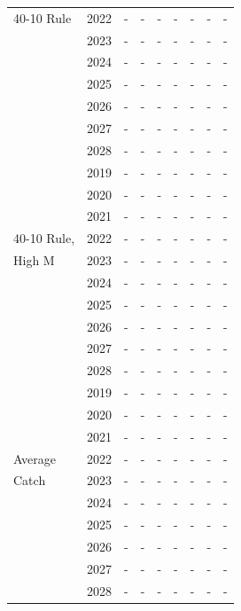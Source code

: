 \documentclass[12pt,]{article}
\begin{document}
\begin{table}[ht]
{\begin{tabular}{l|cc|>{\centering}p{.7in}c|>{\centering}p{.7in}c|>{\centering}p{.7in}c}
  40-10 Rule & 2022 & - & - & - & - & - & - & - \\ 
   & 2023 & - & - & - & - & - & - & - \\ 
   & 2024 & - & - & - & - & - & - & - \\ 
   & 2025 & - & - & - & - & - & - & - \\ 
   & 2026 & - & - & - & - & - & - & - \\ 
   & 2027 & - & - & - & - & - & - & - \\ 
   & 2028 & - & - & - & - & - & - & - \\ 
   \hline
 & 2019 & - & - & - & - & - & - & - \\ 
   & 2020 & - & - & - & - & - & - & - \\ 
   & 2021 & - & - & - & - & - & - & - \\ 
  40-10 Rule, & 2022 & - & - & - & - & - & - & - \\ 
  High M & 2023 & - & - & - & - & - & - & - \\ 
   & 2024 & - & - & - & - & - & - & - \\ 
   & 2025 & - & - & - & - & - & - & - \\ 
   & 2026 & - & - & - & - & - & - & - \\ 
   & 2027 & - & - & - & - & - & - & - \\ 
   & 2028 & - & - & - & - & - & - & - \\ 
   \hline
 & 2019 & - & - & - & - & - & - & - \\ 
   & 2020 & - & - & - & - & - & - & - \\ 
   & 2021 & - & - & - & - & - & - & - \\ 
  Average & 2022 & - & - & - & - & - & - & - \\ 
  Catch & 2023 & - & - & - & - & - & - & - \\ 
   & 2024 & - & - & - & - & - & - & - \\ 
   & 2025 & - & - & - & - & - & - & - \\ 
   & 2026 & - & - & - & - & - & - & - \\ 
   & 2027 & - & - & - & - & - & - & - \\ 
   & 2028 & - & - & - & - & - & - & - \\ 
   \hline
\end{tabular}
}
\end{table}
\end{document}
